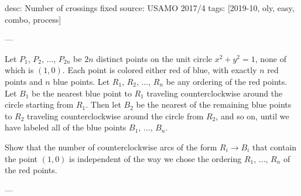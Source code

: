desc: Number of crossings fixed
source: USAMO 2017/4
tags: [2019-10, oly, easy, combo, process]

---

Let $P_1$, $P_2$, $\ldots$, $P_{2n}$ be $2n$ distinct points on the unit circle $x^2+y^2=1$, none of which is $(1,0)$. Each point is colored either red of blue, with exactly $n$ red points and $n$ blue points. Let $R_1$, $R_2$, $\ldots$, $R_n$ be any ordering of the red points. Let $B_1$ be the nearest blue point to $R_1$ traveling counterclockwise around the circle starting from $R_1$. Then let $B_2$ be the nearest of the remaining blue points to $R_2$ traveling counterclockwise around the circle from $R_2$, and so on, until we have labeled all of the blue points $B_1$, $\ldots$, $B_n$.

Show that the number of counterclockwise arcs of the form $R_i\to B_i$ that contain the point $(1,0)$ is independent of the way we chose the ordering $R_1$, $\ldots$, $R_n$ of the red points.


---

